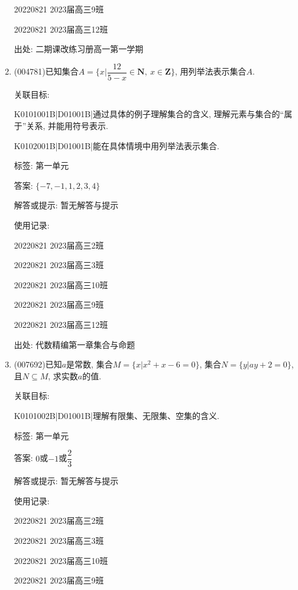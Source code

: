 \documentclass[10pt,a4paper]{article}
\begin{document}
\begin{enumerate}[1.]
20220821	2023届高三9班	

20220821	2023届高三12班	


出处: 二期课改练习册高一第一学期
\newpage
\item{ (004781)}已知集合$A=\{x|\dfrac{12}{5-x}\in \mathbf{N},\ x\in\mathbf{Z}\}$, 用列举法表示集合$A$.


关联目标:

K0101001B|D01001B|通过具体的例子理解集合的含义, 理解元素与集合的``属于''关系, 并能用符号表示.

K0102001B|D01001B|能在具体情境中用列举法表示集合.



标签: 第一单元

答案: $\{-7,-1,1,2,3,4\}$

解答或提示: 暂无解答与提示

使用记录:

20220821	2023届高三2班	

20220821	2023届高三3班	

20220821	2023届高三10班	

20220821	2023届高三9班	

20220821	2023届高三12班	


出处: 代数精编第一章集合与命题
\newpage
\item{ (007692)}已知$a$是常数, 集合$M=\{x|x^2+x-6=0\}$, 集合$N=\{y|ay+2=0\}$, 且$N\subseteq M$, 求实数$a$的值.


关联目标:

K0101002B|D01001B|理解有限集、无限集、空集的含义.



标签: 第一单元

答案: $0$或$-1$或$\dfrac 23$

解答或提示: 暂无解答与提示

使用记录:

20220821	2023届高三2班	

20220821	2023届高三3班	

20220821	2023届高三10班	

20220821	2023届高三9班	


\end{enumerate}
\end{document}
